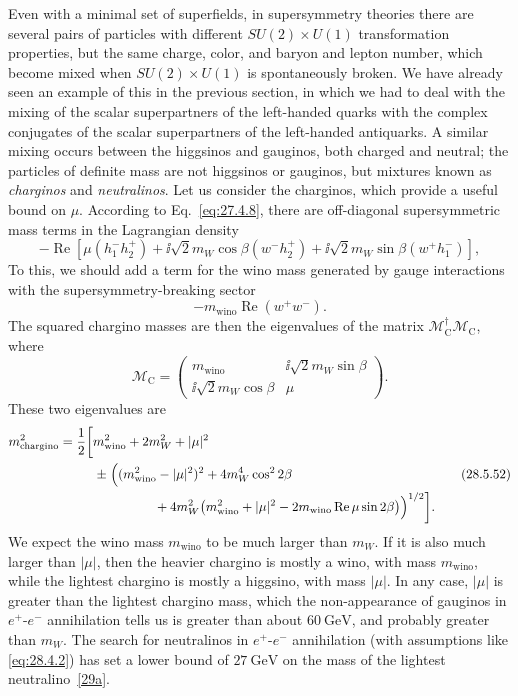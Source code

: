Even with a minimal set of superfields, in supersymmetry theories there are
several pairs of particles with different \(SU(2)\times U(1)\)
transformation properties, but the same charge, color, and baryon and
lepton number, which become mixed when \(SU(2)\times U(1)\) is
spontaneously broken. We have already seen an example of this in the
previous section, in which we had to deal with the mixing of the scalar
superpartners of the left-handed quarks with the complex conjugates of the
scalar superpartners of the left-handed antiquarks. A similar mixing occurs
between the higgsinos and gauginos, both charged and neutral; the particles
of definite mass are not higgsinos or gauginos, but mixtures known as
\textit{charginos} and \textit{neutralinos}. Let us consider the charginos,
which provide a useful bound on \(\mu\). According to
Eq.~\eqref{eq:27.4.8}, there are off-diagonal supersymmetric mass terms in
the Lagrangian density
\[
  -\operatorname{Re}\left[
    \mu\left(h_1^-h_2^+\right)
    +\ii\sqrt{2}m_W\cos\beta
      \left(w^-h_2^+\right)
    +\ii\sqrt{2}m_W\sin\beta
      \left(w^+h_1^-\right)
  \right],
\]
To this, we should add a term for the wino mass generated by gauge
interactions with the supersymmetry-breaking sector
\[
  -m_{\mathrm{wino}}\operatorname{Re}
    \left(w^+w^-\right).
\]
The squared chargino masses are then the eigenvalues of the matrix
\(\mathcal{M}_{\mathrm C}^\dagger\mathcal{M}_{\mathrm C}\), where
\begin{equation}
  \mathcal{M}_{\mathrm C}
  =
  \begin{pmatrix}
    m_{\mathrm{wino}} & \ii\sqrt{2}m_W\sin\beta\\
    \ii\sqrt{2}m_W\cos\beta & \mu
  \end{pmatrix}.
  \tag{28.5.51}\label{eq:28.5.51}
\end{equation}
These two eigenvalues are
\begin{equation}
  \begin{aligned}
  m_{\mathrm{chargino}}^2
  =\frac12\biggl[
    &m_{\mathrm{wino}}^2+2m_W^2+|\mu|^2\\
    &\mathrel{\pm}\Bigl(
      (m_{\mathrm{wino}}^2-|\mu|^2)^2
      +4m_W^4\cos^22\beta\\
    &\hspace{4.7em}
      +4m_W^2\bigl(
        m_{\mathrm{wino}}^2+|\mu|^2
        -2m_{\mathrm{wino}}\operatorname{Re}\mu\sin2\beta
      \bigr)
    \Bigr)^{1/2}
  \biggr].
  \end{aligned}
  \tag{28.5.52}\label{eq:28.5.52}
\end{equation}
We expect the wino mass \(m_{\mathrm{wino}}\) to be much larger than
\(m_W\). If it is also much larger than \(|\mu|\), then the heavier
chargino is mostly a wino, with mass \(m_{\mathrm{wino}}\), while the
lightest chargino is mostly a higgsino, with mass \(|\mu|\). In any case,
\(|\mu|\) is greater than the lightest chargino mass, which the
non-appearance of gauginos in \(e^+\)-\(e^-\) annihilation tells us is
greater than about \(60\ \mathrm{GeV}\), and probably greater than \(m_W\).
The search for neutralinos in \(e^+\)-\(e^-\) annihilation (with
assumptions like \eqref{eq:28.4.2}) has set a lower bound of
\(27\ \mathrm{GeV}\) on the mass of the lightest
neutralino~\hyperref[ch28-ref-29a]{[29a]}.
